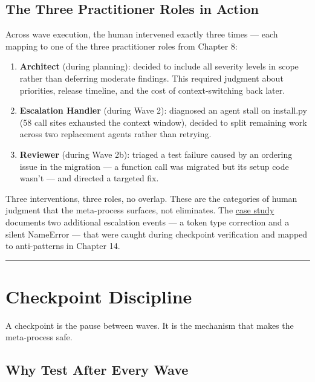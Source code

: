 \documentclass[
  a4paper,
  DIV=11,
  numbers=noendperiod]{scrreprt}
\providecommand{\tightlist}{%
  \setlength{\itemsep}{0pt}\setlength{\parskip}{0pt}}
\begin{document}
\subsection{The Three Practitioner Roles in
Action}\label{the-three-practitioner-roles-in-action}

Across wave execution, the human intervened exactly three times --- each
mapping to one of the three practitioner roles from Chapter 8:

\begin{enumerate}
\def\labelenumi{\arabic{enumi}.}
\tightlist
\item
  \textbf{Architect} (during planning): decided to include all severity
  levels in scope rather than deferring moderate findings. This required
  judgment about priorities, release timeline, and the cost of
  context-switching back later.
\item
  \textbf{Escalation Handler} (during Wave 2): diagnosed an agent stall
  on install.py (58 call sites exhausted the context window), decided to
  split remaining work across two replacement agents rather than
  retrying.
\item
  \textbf{Reviewer} (during Wave 2b): triaged a test failure caused by
  an ordering issue in the migration --- a function call was migrated
  but its setup code wasn't --- and directed a targeted fix.
\end{enumerate}

Three interventions, three roles, no overlap. These are the categories
of human judgment that the meta-process surfaces, not eliminates. The
\href{../case-study-apm-overhaul.qmd}{case study} documents two
additional escalation events --- a token type correction and a silent
NameError --- that were caught during checkpoint verification and mapped
to anti-patterns in Chapter 14.

\begin{center}\rule{0.5\linewidth}{0.5pt}\end{center}

\section{Checkpoint Discipline}\label{checkpoint-discipline}

A checkpoint is the pause between waves. It is the mechanism that makes
the meta-process safe.

\subsection{Why Test After Every Wave}\label{why-test-after-every-wave}
\end{document}
